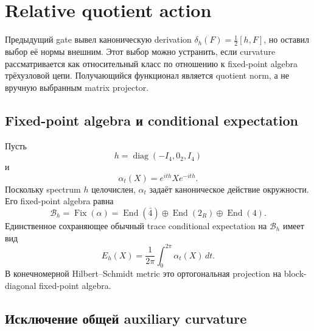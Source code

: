 \section{Relative quotient action}

Предыдущий gate вывел каноническую derivation
\(\delta_h(F)=\frac12[h,F]\), но оставил выбор её нормы внешним. Этот
выбор можно устранить, если curvature рассматривается как относительный
класс по отношению к fixed-point algebra трёхузловой цепи. Получающийся
функционал является quotient norm, а не вручную выбранным matrix projector.

\subsection{Fixed-point algebra и conditional expectation}

Пусть
\begin{equation}
 h=\operatorname{diag}(-I_4,0_2,I_4)
\end{equation}
и
\begin{equation}
 \alpha_t(X)=e^{ith}Xe^{-ith}.
\end{equation}
Поскольку spectrum \(h\) целочислен, \(\alpha_t\) задаёт каноническое
действие окружности. Его fixed-point algebra равна
\begin{equation}
 \mathcal B_h=\operatorname{Fix}(\alpha)
 =\operatorname{End}(\bar4)\oplus
  \operatorname{End}(2_R)\oplus\operatorname{End}(4).
 \label{eq:ps-relative-fixed-algebra}
\end{equation}
Единственное сохраняющее обычный trace conditional expectation на
\(\mathcal B_h\) имеет вид
\begin{equation}
 E_h(X)=\frac1{2\pi}\int_0^{2\pi}\alpha_t(X)\,dt.
 \label{eq:ps-relative-expectation}
\end{equation}
В конечномерной Hilbert--Schmidt metric это ортогональная projection на
block-diagonal fixed-point algebra.

\subsection{Исключение общей auxiliary curvature}

